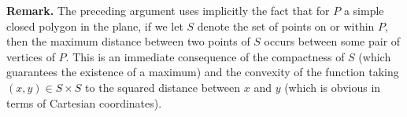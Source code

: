 \documentclass[amssymb,twocolumn,pra,10pt,aps]{revtex4-1}
\begin{document}
\begin{itemize}
\noindent
\textbf{Remark.} The preceding argument uses implicitly the fact that for $P$ a simple closed polygon in the plane, if we let $S$ denote the set of points on or within $P$, then  the maximum distance between two points of $S$ occurs between some pair of vertices of $P$.
This is an immediate consequence of the compactness of $S$ (which guarantees the existence of a maximum) and the convexity of the function taking $(x,y) \in S \times S$ to the squared distance between $x$ and $y$ (which is obvious in terms of Cartesian coordinates).

\end{itemize}
\end{document}
